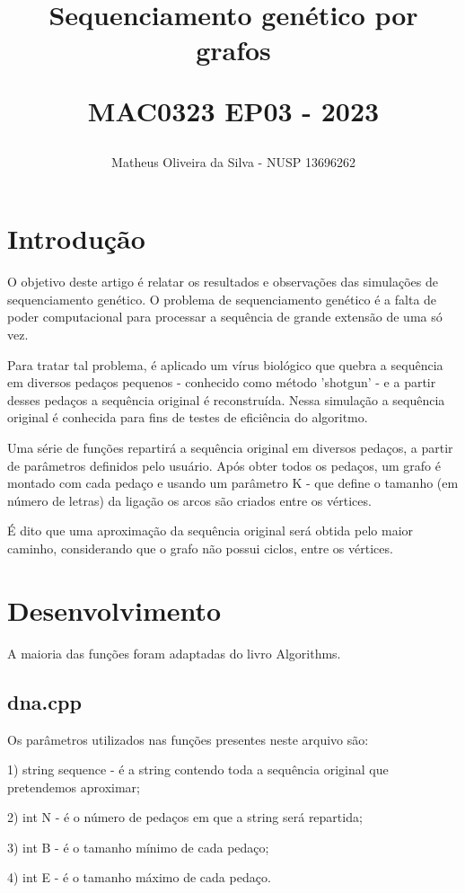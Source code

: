 \documentclass{article}
\title{Sequenciamento genético por grafos

MAC0323 EP03 - 2023}
\author{ Matheus Oliveira da Silva - NUSP 13696262 }
\begin{document}
\date{}
\maketitle

\begin{multicols}{2}
\section{Introdução}

O objetivo deste artigo é relatar os resultados e observações das simulações de sequenciamento genético.
O problema de sequenciamento genético é a falta de poder computacional para processar a sequência de grande extensão de uma só vez.

Para tratar tal problema, é aplicado um vírus biológico que quebra a sequência em diversos pedaços pequenos - conhecido como método 'shotgun' - e a partir desses pedaços a sequência original é reconstruída.
Nessa simulação a sequência original é conhecida para fins de testes de eficiência do algoritmo.

Uma série de funções repartirá a sequência original em diversos pedaços, a partir de parâmetros definidos pelo usuário. Após obter todos os pedaços, um grafo é montado com cada pedaço e usando um parâmetro K - que define o tamanho (em número de letras) da ligação os arcos são criados entre os vértices.

É dito que uma aproximação da sequência original será obtida pelo maior caminho, considerando que o grafo não possui ciclos, entre os vértices.

\section{Desenvolvimento}
A maioria das funções foram adaptadas do livro Algorithms\cite{SEDGEWICK}.
\subsection{dna.cpp}
Os parâmetros utilizados nas funções presentes neste arquivo são:

1) string sequence - é a string contendo toda a sequência original que pretendemos aproximar;

2) int N - é o número de pedaços em que a string será repartida;

3) int B - é o tamanho mínimo de cada pedaço;

4) int E - é o tamanho máximo de cada pedaço.


\end{multicols}
\end{document}
